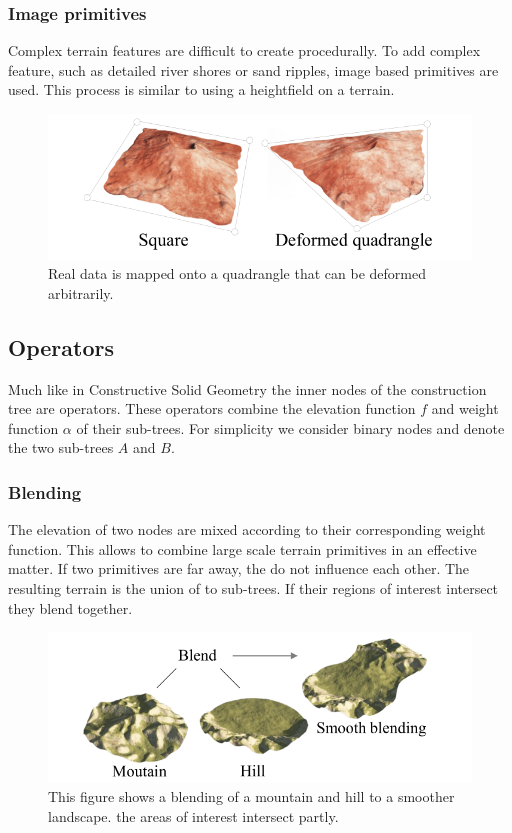 \subsubsection{Image primitives}
Complex terrain features are difficult to create procedurally. To add complex feature, such as detailed river shores or sand ripples, image based primitives are used. This process is similar to using a heightfield on a terrain. 

\begin{figure}[htb]
	\centering
	\includegraphics[width=.8\linewidth]{CGFCGF12530/image_primitive}
	\caption{Real data is mapped onto a quadrangle that can be deformed arbitrarily.}
	\label{fig:image_primitive}
\end{figure}


\subsection{Operators}
Much like in Constructive Solid Geometry the inner nodes of the construction tree are operators. These operators combine the elevation function $f$ and weight function $\alpha$ of their sub-trees. For simplicity we consider binary nodes and denote the two sub-trees $A$ and $B$. 

\subsubsection{Blending}
The elevation of two nodes are mixed according to their corresponding weight function. This allows to combine large scale terrain primitives in an effective matter. If two primitives are far away, the do not influence each other. The resulting terrain is the union of to sub-trees. If their regions of interest intersect they blend together.
\begin{figure}[htb]
	\centering
	\includegraphics[width=.8\linewidth]{CGFCGF12530/blend_operator}
	\caption{This figure shows a blending of a mountain and hill to a smoother landscape. the areas of interest intersect partly. }
	\label{fig:blend_operator}
\end{figure}

